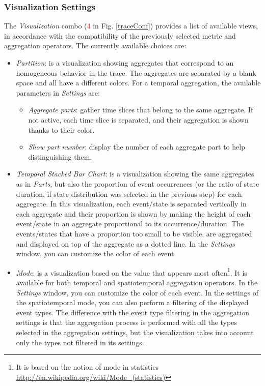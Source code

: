 \documentclass[twoside]{article}
\begin{document}
\begin{sloppypar}
\subsubsection{Visualization Settings}
\label{visuop}
The \textit{Visualization} combo (\textcolor{red}{4} in Fig. \ref{traceConf}) provides a list of available views, in accordance with the compatibility of the previously selected metric and aggregation operators. The currently available choices are:
\begin{itemize}
	\item \textit{Partition}: is a visualization showing aggregates that correspond to an homogeneous behavior in the trace. The aggregates are separated by a blank space and all have a different colors. For a temporal aggregation, the available parameters in \textit{Settings} are:
	\begin{itemize}
		\item \textit{Aggregate parts}: gather time slices that belong to the same aggregate. If not active, each time slice is separated, and their aggregation is shown thanks to their color.
		\item \textit{Show part number}: display the number of each aggregate part to help distinguishing them.
	\end{itemize}
	\item \textit{Temporal Stacked Bar Chart}: is a visualization showing the same aggregates as in \textit{Parts}, but also the proportion of event occurrences (or the ratio of state duration, if state distribution was selected in the previous step) for each aggregate. In this visualization, each event/state is separated vertically in each aggregate and their proportion is shown by making the height of each event/state in an aggregate proportional to its occurrence/duration. The events/states that have a proportion too small to be visible, are aggregated and displayed on top of the aggregate as a dotted line. In the \textit{Settings} window, you can customize the color of each event.
	\item \textit{Mode}: is a visualization based on the value that appears most often\footnote{It is based on the notion of mode in statistics \url{http://en.wikipedia.org/wiki/Mode_(statistics)}}. It is available for both temporal and spatiotemporal aggregation operators. In the \textit{Settings} window, you can customize the color of each event. In the settings of the spatiotemporal mode, you can also perform a filtering of the displayed event types. The difference with the event type filtering in the aggregation settings is that the aggregation process is performed with all the types selected in the aggregation settings, but the visualization takes into account only the types not filtered in its settings. 
\end{itemize}


\end{sloppypar}
\end{document}
